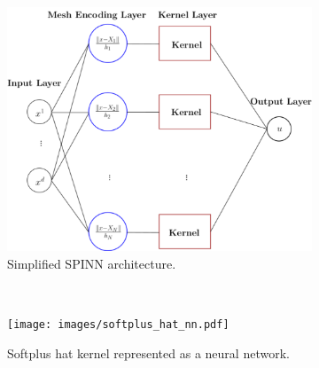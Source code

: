 \documentclass[12pt]{article}
\begin{document}
\begin{figure}[htpb]
\begin{subfigure}{0.6\textwidth}
\centering
\includegraphics[width=\textwidth]{images/SPINN.pdf}
\caption{Simplified SPINN architecture.}
\label{fig:meshless_nn_repr}
\end{subfigure}
~
\begin{subfigure}{0.4\textwidth}
\centering
\texttt{[image: images/softplus\_hat\_nn.pdf]}
\caption{Softplus hat kernel represented as a neural network.}
\label{fig:softplus_hat_nn}
\end{subfigure}
\begin{center}
\begin{subfigure}{0.5\textwidth}
\centering

\end{subfigure}
\end{center}
\end{figure}
\end{document}
